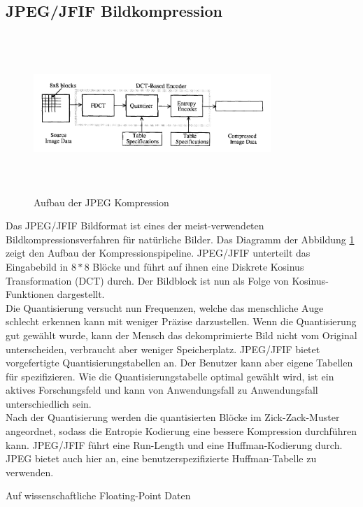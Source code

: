 \subsection{JPEG/JFIF Bildkompression}
\begin{figure}[!htbp]
	\center
	\includegraphics[width=0.8\textwidth,height=6cm,keepaspectratio]{./pictures/state/jpeg.png}
	\caption{Aufbau der JPEG Kompression \cite{wallace1992jpeg}}
	\label{state:jpeg:abb}
\end{figure}
Das JPEG/JFIF Bildformat ist eines der meist-verwendeten Bildkompressionsverfahren für natürliche Bilder. Das Diagramm der Abbildung \ref{state:jpeg:abb} zeigt den Aufbau der Kompressionspipeline. JPEG/JFIF unterteilt das Eingabebild in $8*8$ Blöcke und führt auf ihnen eine Diskrete Kosinus Transformation (DCT) durch. Der Bildblock ist nun als Folge von Kosinus-Funktionen dargestellt.\\
Die Quantisierung versucht nun Frequenzen, welche das menschliche Auge schlecht erkennen kann mit weniger Präzise darzustellen. Wenn die Quantisierung gut gewählt wurde, kann der Mensch das dekomprimierte Bild nicht vom Original unterscheiden, verbraucht aber weniger Speicherplatz. JPEG/JFIF bietet vorgefertigte Quantisierungstabellen an. Der Benutzer kann aber eigene Tabellen für spezifizieren. Wie die Quantisierungstabelle optimal gewählt wird, ist ein aktives Forschungsfeld \cite{wu1993rate:jpeg} \cite{wang2001designing:jpeg} und kann von Anwendungsfall zu Anwendungsfall unterschiedlich sein.\\
Nach der Quantisierung werden die quantisierten Blöcke im Zick-Zack-Muster angeordnet, sodass die Entropie Kodierung eine bessere Kompression durchführen kann. JPEG/JFIF führt eine Run-Length und eine Huffman-Kodierung durch. JPEG bietet auch hier an, eine benutzerspezifizierte Huffman-Tabelle zu verwenden.

Auf wissenschaftliche Floating-Point Daten

